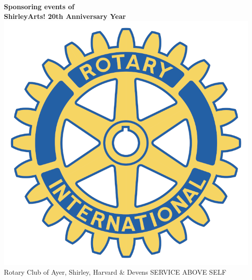 \documentclass[12pt, a5paper, oneside]{article}
\begin{document}
\pagebreak
\begin{center}
\large\textbf{Sponsoring events of\\  
ShirleyArts! 20th Anniversary Year} \\
\includegraphics[scale=0.15]{media/rotary_international.png}\\
Rotary Club of Ayer, Shirley, Harvard \& Devens 
SERVICE ABOVE SELF\\
\end{center} 
\normalsize
\end{document}
